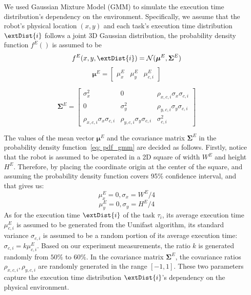     
    We used Gaussian Mixture Model (GMM) to simulate the execution time distribution's dependency on the environment. Specifically, we assume that the robot's physical location $(x, y)$ and each task's execution time distribution $\extDist{i}$ follows a joint 3D Gaussian distribution, the probability density function $f^{E}()$ is assumed to be
    \begin{equation}
        f^{E}(x, y, \extDist{i}) =\mathcal{N}(\boldsymbol{\mu}^E, \boldsymbol{\Sigma}^E)
        \label{eq: pdf_gmm}
    \end{equation}
    \begin{equation}
        \boldsymbol{\mu}^E = \begin{bmatrix}
            \mu^E_x & \mu^E_y & \mu^E_{c,i}
        \end{bmatrix}
    \end{equation}
    
\begin{equation}
    \boldsymbol{\Sigma}^E =
    \begin{bmatrix}
        \sigma_x^2 & 0 & \rho_{x,c,i} \sigma_x \sigma_{c,i} \\
        0 & \sigma_y^2 & \rho_{y,c,i} \sigma_y \sigma_{c,i} \\
        \rho_{x,c,i} \sigma_x \sigma_{c,i} & \rho_{y,c,i} \sigma_y \sigma_{c,i} & \sigma_{c,i}^2
    \end{bmatrix}
\end{equation}

    The values of the mean vector $\boldsymbol{\mu}^E$ and the covariance matrix $ \boldsymbol{\Sigma}^E$ in the probability density function~\eqref{eq: pdf_gmm} are decided as follows. 
    Firstly, notice that the robot is assumed to be operated in a 2D square of width $W^E$ and height $H^E$. Therefore, by placing the coordinate origin at the center of the square, and assuming the probability density function covers 95\% confidence interval, and that gives us:
    \begin{equation}
        \mu^E_x = 0, \sigma_x = W^E/4
    \end{equation}
    \begin{equation}
        \mu^E_y = 0, \sigma_y = H^E/4
    \end{equation}
    As for the execution time $\extDist{i}$ of the task $\tau_i$, its average execution time $\mu^E_{c,i}$ is assumed to be generated from the Uunifast algorithm, its standard variance $\sigma_{c,i}$ is assumed to be a random portion of its average execution time: $\sigma_{c,i}=k\mu^E_{c,i}$. Based on our experiment measurements, the ratio $k$ is generated randomly from $50\%$ to $60\%$.
    In the covariance matrix $\boldsymbol{\Sigma}^E$, the covariance ratios $\rho_{x,c,i}, \rho_{y,c,i}$ are randomly generated in the range $[-1,1]$. These two parameters capture the execution time distribution $\extDist{i}$'s dependency on the physical environment.

